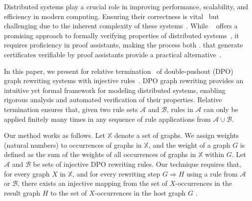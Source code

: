 Distributed systems play a crucial role in improving performance, 
scalability, and efficiency in modern computing. Ensuring their correctness is vital~\cite{heiser2010theroad} but challenging due to the inherent complexity of these systems~\cite{lamport2019thebyzantine}.
While ~\cite{harrison2014history} offers a promising approach to formally verifying properties of distributed systems~\cite{plump2024formalisingDPO,potop2019formal,courtieu2016certified},  
it requires proficiency in proof assistants, making the process both .  that generate certificates verifiable by proof assistants provide a practical alternative~\cite{contejean2011automated,giesl2014proving}.  
  
In this paper, we present  for relative termination~\cite{geser1990relative} of double-pushout (DPO) graph rewriting systems with injective rules~.
DPO graph rewriting provides an intuitive yet formal framework for modeling distributed systems, enabling rigorous analysis and automated verification of  their properties.
Relative termination ensures that, given two rule sets \( \mathcal{A} \) and \( \mathcal{B} \), rules in $\mathcal{A}$ can only be applied finitely many times in any sequence of rule applications from $\mathcal{A} \cup \mathcal{B}$.

Our method works as follows. Let \( \mathbb{X} \) denote a set of graphs. We assign weights (natural numbers) to occurrences of graphs in \( \mathbb{X} \), and the weight of a graph $G$ is defined as the sum of the weights of all occurrences of graphs in \( \mathbb{X} \) within $G$. Let $\mathcal{A}$ and $\mathcal{B}$ be sets of injective DPO rewriting rules. Our technique requires that, for every graph $X$ in $\mathbb{X}$, and for every rewriting step $G \Rightarrow H$ using a rule from $\mathcal{A}$ or $\mathcal{B}$, there exists an injective mapping from the set of \( X \)-occurrences in the result graph $H$
 to the set of \( X \)-occurrences in the host graph $G$ .   

